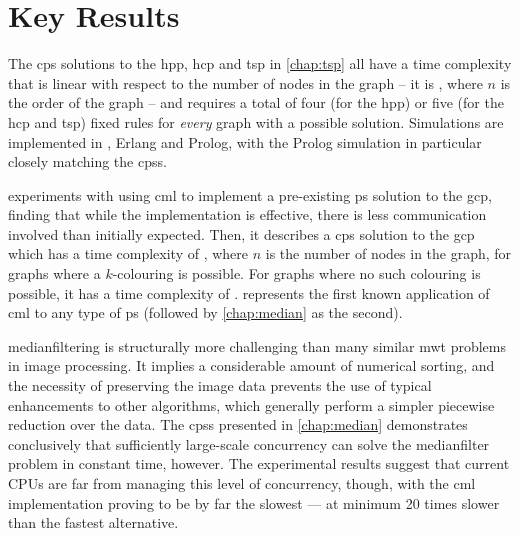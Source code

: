 


\section{Key Results}

The \gls{cps} solutions to the \gls{hpp}, \gls{hcp} and \gls{tsp} in \cref{chap:tsp} all have a time complexity that is linear with respect to the number of nodes in the graph -- \ie{} it is , where \(n\) is the order of the graph -- and requires a total of four (for the \gls{hpp}) or five (for the \gls{hcp} and \gls{tsp}) fixed rules for \emph{every} graph with a possible solution.  Simulations are implemented in \fsharp{}, Erlang and Prolog, with the Prolog simulation in particular closely matching the \glspl{cps}.

 experiments with using \gls{cml} to implement a pre-existing \gls{ps} solution to the \gls{gcp}, finding that while the implementation is effective, there is less communication involved than initially expected.  Then, it describes a \gls{cps} solution to the \gls{gcp} which has a time complexity of , where \(n\) is the number of nodes in the graph, for graphs where a \(k\)-colouring is possible.  For graphs where no such colouring is possible, it has a time complexity of .   represents the first known application of \gls{cml} to any type of \gls{ps} (followed by \cref{chap:median} as the second).

\Gls{medianfilter}ing is structurally more challenging than many similar \gls{mwt} problems in image processing.  It implies a considerable amount of numerical sorting, and the necessity of preserving the image data prevents the use of typical enhancements to other algorithms, which generally perform a simpler piecewise reduction over the data.  The \glspl{cps} presented in \cref{chap:median} demonstrates conclusively that sufficiently large-scale concurrency can solve the \gls{medianfilter} problem in constant time, however.  The experimental results suggest that current CPUs are far from managing this level of concurrency, though, with the \gls{cml} implementation proving to be by far the slowest --- at minimum 20 times slower than the fastest alternative.

